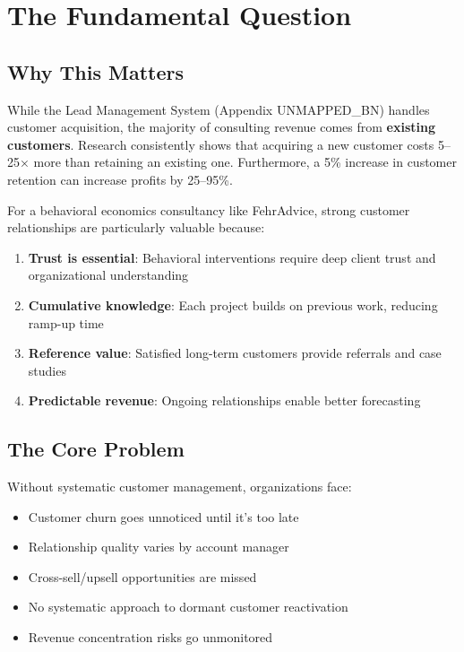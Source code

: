 \section{The Fundamental Question}
\label{sec:bp-fundamental}

\subsection{Why This Matters}

While the Lead Management System (Appendix UNMAPPED_BN) handles customer acquisition,
the majority of consulting revenue comes from \textbf{existing customers}.
Research consistently shows that acquiring a new customer costs 5--25× more
than retaining an existing one. Furthermore, a 5\% increase in customer
retention can increase profits by 25--95\%.

For a behavioral economics consultancy like FehrAdvice, strong customer
relationships are particularly valuable because:
\begin{enumerate}
\item \textbf{Trust is essential}: Behavioral interventions require deep
      client trust and organizational understanding
\item \textbf{Cumulative knowledge}: Each project builds on previous work,
      reducing ramp-up time
\item \textbf{Reference value}: Satisfied long-term customers provide
      referrals and case studies
\item \textbf{Predictable revenue}: Ongoing relationships enable better
      forecasting
\end{enumerate}

\subsection{The Core Problem}

Without systematic customer management, organizations face:
\begin{itemize}
\item Customer churn goes unnoticed until it's too late
\item Relationship quality varies by account manager
\item Cross-sell/upsell opportunities are missed
\item No systematic approach to dormant customer reactivation
\item Revenue concentration risks go unmonitored
\end{itemize}

